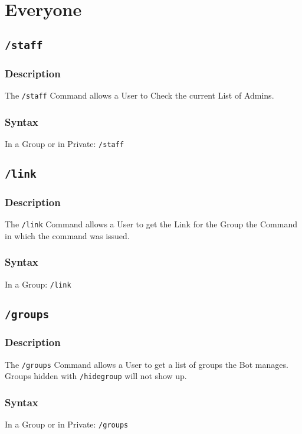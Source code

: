 \documentclass[a4paper]{article}
\begin{document}
\newpage
\section{Everyone}
    \subsection{\texttt{/staff}}
        \subsubsection*{Description}
            The \texttt{/staff} Command allows a User to Check the current List of Admins.

        \subsubsection*{Syntax}
            In a Group or in Private: \texttt{/staff}\\

    \subsection{\texttt{/link}}
        \subsubsection*{Description}
            The \texttt{/link} Command allows a User to get the Link for the Group the Command in which the command was issued.

        \subsubsection*{Syntax}
            In a Group: \texttt{/link}\\
    \subsection{\texttt{/groups}}
        \subsubsection*{Description}
            The \texttt{/groups} Command allows a User to get a list of groups the Bot manages. Groups hidden with \texttt{/hidegroup} will not show up.

        \subsubsection*{Syntax}
            In a Group or in Private: \texttt{/groups}\\
\end{document}
